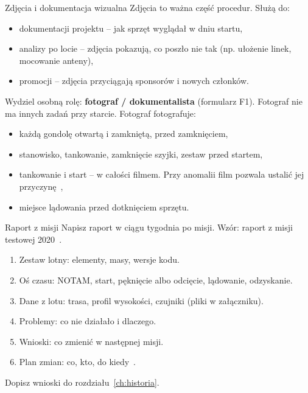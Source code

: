 \begin{sekcja}{Zdjęcia i dokumentacja wizualna}
Zdjęcia to ważna część procedur. Służą do:
\begin{itemize}
  \item dokumentacji projektu -- jak sprzęt wyglądał w dniu startu,
  \item analizy po locie -- zdjęcia pokazują, co poszło nie tak (np. ułożenie linek, mocowanie anteny),
  \item promocji -- zdjęcia przyciągają sponsorów i nowych członków.
\end{itemize}

Wydziel osobną rolę: \textbf{fotograf / dokumentalista} (formularz F1). Fotograf nie ma innych zadań przy starcie. Fotograf fotografuje:
\begin{itemize}
  \item każdą gondolę otwartą i zamkniętą, przed zamknięciem,
  \item stanowisko, tankowanie, zamknięcie szyjki, zestaw przed startem,
  \item tankowanie i start -- w całości filmem. Przy anomalii film pozwala ustalić jej przyczynę~\cite[rozdz.~11]{nasahb},
  \item miejsce lądowania przed dotknięciem sprzętu.
\end{itemize}
\end{sekcja}

\begin{sekcja}{Raport z misji}
Napisz raport w ciągu tygodnia po misji. Wzór: raport z misji testowej 2020~\cite{raport2020}.
\begin{enumerate}
  \item Zestaw lotny: elementy, masy, wersje kodu.
  \item Oś czasu: NOTAM, start, pęknięcie albo odcięcie, lądowanie, odzyskanie.
  \item Dane z lotu: trasa, profil wysokości, czujniki (pliki w załączniku).
  \item Problemy: co nie działało i dlaczego.
  \item Wnioski: co zmienić w następnej misji.
  \item Plan zmian: co, kto, do kiedy~\cite[rozdz.~11]{nasahb}.
\end{enumerate}
Dopisz wnioski do rozdziału~\ref{ch:historia}.
\end{sekcja}

